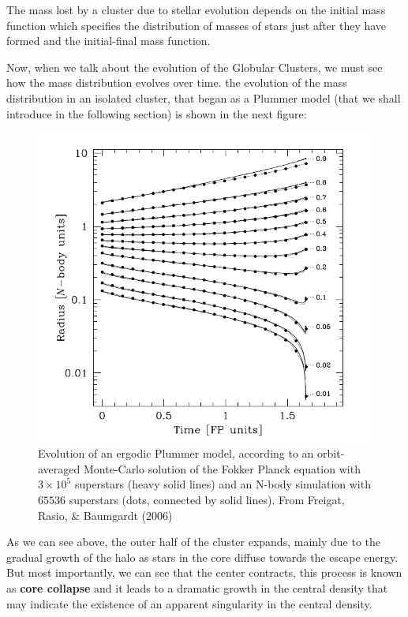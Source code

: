 The mass lost by a cluster due to stellar evolution depends on the initial mass function  which specifies the distribution of masses of stars just after they have formed and the initial-final mass function. 

Now, when we talk about the evolution of the Globular Clusters, we must see how the mass distribution evolves over time. the evolution of the mass distribution in an isolated cluster, that began as a Plummer model (that we shall introduce in the following section) is shown in the next figure:

\begin{figure}[H]
\centering
\includegraphics[width=12cm]{images/core_collapse.png}
\caption[Evolution of an ergodic Plummer model over time]{Evolution of an ergodic Plummer model, according to an orbit-averaged Monte-Carlo solution of the Fokker Planck equation with $3\times10^{5}$ superstars (heavy solid lines) and an N-body simulation with $65536$ superstars (dots, connected by solid lines). From Freigat, Rasio, \& Baumgardt (2006)}
\end{figure}

As we can see above, the outer half of the cluster expands, mainly due to the gradual growth of the halo as stars in the core diffuse towards the escape energy. But most importantly, we can see that the center contracts, this process is known as \textbf{core collapse} and it leads to a dramatic growth in the central density that may indicate the existence of an apparent singularity in the central density.

